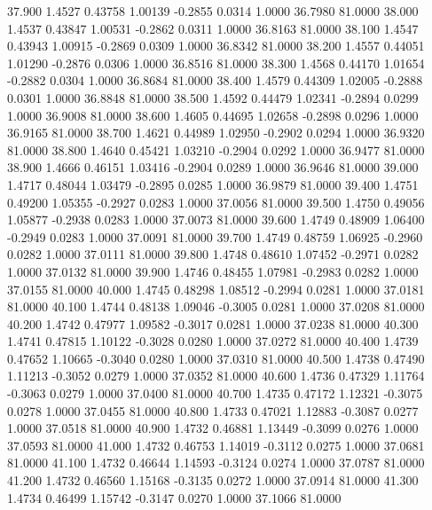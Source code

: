   37.900   1.4527   0.43758   1.00139  -0.2855   0.0314   1.0000  36.7980  81.0000
  38.000   1.4537   0.43847   1.00531  -0.2862   0.0311   1.0000  36.8163  81.0000
  38.100   1.4547   0.43943   1.00915  -0.2869   0.0309   1.0000  36.8342  81.0000
  38.200   1.4557   0.44051   1.01290  -0.2876   0.0306   1.0000  36.8516  81.0000
  38.300   1.4568   0.44170   1.01654  -0.2882   0.0304   1.0000  36.8684  81.0000
  38.400   1.4579   0.44309   1.02005  -0.2888   0.0301   1.0000  36.8848  81.0000
  38.500   1.4592   0.44479   1.02341  -0.2894   0.0299   1.0000  36.9008  81.0000
  38.600   1.4605   0.44695   1.02658  -0.2898   0.0296   1.0000  36.9165  81.0000
  38.700   1.4621   0.44989   1.02950  -0.2902   0.0294   1.0000  36.9320  81.0000
  38.800   1.4640   0.45421   1.03210  -0.2904   0.0292   1.0000  36.9477  81.0000
  38.900   1.4666   0.46151   1.03416  -0.2904   0.0289   1.0000  36.9646  81.0000
  39.000   1.4717   0.48044   1.03479  -0.2895   0.0285   1.0000  36.9879  81.0000
  39.400   1.4751   0.49200   1.05355  -0.2927   0.0283   1.0000  37.0056  81.0000
  39.500   1.4750   0.49056   1.05877  -0.2938   0.0283   1.0000  37.0073  81.0000
  39.600   1.4749   0.48909   1.06400  -0.2949   0.0283   1.0000  37.0091  81.0000
  39.700   1.4749   0.48759   1.06925  -0.2960   0.0282   1.0000  37.0111  81.0000
  39.800   1.4748   0.48610   1.07452  -0.2971   0.0282   1.0000  37.0132  81.0000
  39.900   1.4746   0.48455   1.07981  -0.2983   0.0282   1.0000  37.0155  81.0000
  40.000   1.4745   0.48298   1.08512  -0.2994   0.0281   1.0000  37.0181  81.0000
  40.100   1.4744   0.48138   1.09046  -0.3005   0.0281   1.0000  37.0208  81.0000
  40.200   1.4742   0.47977   1.09582  -0.3017   0.0281   1.0000  37.0238  81.0000
  40.300   1.4741   0.47815   1.10122  -0.3028   0.0280   1.0000  37.0272  81.0000
  40.400   1.4739   0.47652   1.10665  -0.3040   0.0280   1.0000  37.0310  81.0000
  40.500   1.4738   0.47490   1.11213  -0.3052   0.0279   1.0000  37.0352  81.0000
  40.600   1.4736   0.47329   1.11764  -0.3063   0.0279   1.0000  37.0400  81.0000
  40.700   1.4735   0.47172   1.12321  -0.3075   0.0278   1.0000  37.0455  81.0000
  40.800   1.4733   0.47021   1.12883  -0.3087   0.0277   1.0000  37.0518  81.0000
  40.900   1.4732   0.46881   1.13449  -0.3099   0.0276   1.0000  37.0593  81.0000
  41.000   1.4732   0.46753   1.14019  -0.3112   0.0275   1.0000  37.0681  81.0000
  41.100   1.4732   0.46644   1.14593  -0.3124   0.0274   1.0000  37.0787  81.0000
  41.200   1.4732   0.46560   1.15168  -0.3135   0.0272   1.0000  37.0914  81.0000
  41.300   1.4734   0.46499   1.15742  -0.3147   0.0270   1.0000  37.1066  81.0000
